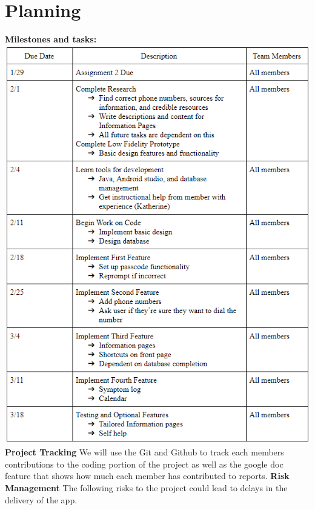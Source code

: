\documentclass[letterpaper,12pt,titlepage]{article}
\begin{document}
\section{Planning}
\textbf{Milestones and tasks:}
\newline
\newline
\includegraphics[scale=.796]{Table1}
\newpage
\noindent
\textbf{Project Tracking}
\newline
\newline
We will use the Git and Github to track each members contributions to the coding portion of the project as well as the google doc feature that shows how much each member has contributed to reports.
\newline
\newline
\textbf{Risk Management}
\newline
\newline
The following risks to the project could lead to delays in the delivery of the app.
\newline
\newline
\end{document}

